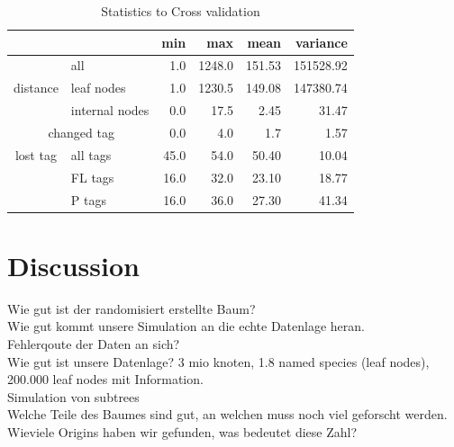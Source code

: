       \begin{table}
        \begin{center}
          \begin{tabular}{ |cl||r|r|r|r| }
            \hline
            & & min & max & mean & variance \\
            \hline \hline
            \multirow{3}{*}{distance} & all & 1.0 & 1248.0 & 151.53 & 151528.92 \\
            & leaf nodes                    & 1.0 & 1230.5 & 149.08 & 147380.74 \\
            & internal nodes                & 0.0 & 17.5 & 2.45 & 31.47 \\ \hline
            \multicolumn{2}{|c||}{changed tag} & 0.0 & 4.0 & 1.7 & 1.57 \\ \hline
            lost tag & all tags             & 45.0 & 54.0 & \cellcolor{green!50}50.40 & 10.04 \\
            & FL tags                       & 16.0 & 32.0 & 23.10 & 18.77 \\
            & P tags                        & 16.0 & 36.0 & 27.30 & 41.34 \\
            \hline
          \end{tabular}
        \end{center}
        \caption{Statistics to Cross validation}
      \end{table}
  
\chapter{Discussion}
  Wie gut ist der randomisiert erstellte Baum? \\
  Wie gut kommt unsere Simulation an die echte Datenlage heran. \\
  Fehlerqoute der Daten an sich? \\
  Wie gut ist unsere Datenlage? 3 mio knoten, 1.8 named species (leaf nodes), 200.000 leaf nodes mit 
  Information. \\
  Simulation von subtrees \\
  Welche Teile des Baumes sind gut, an welchen muss noch viel geforscht werden. \\
  Wieviele Origins haben wir gefunden, was bedeutet diese Zahl? \\
  
